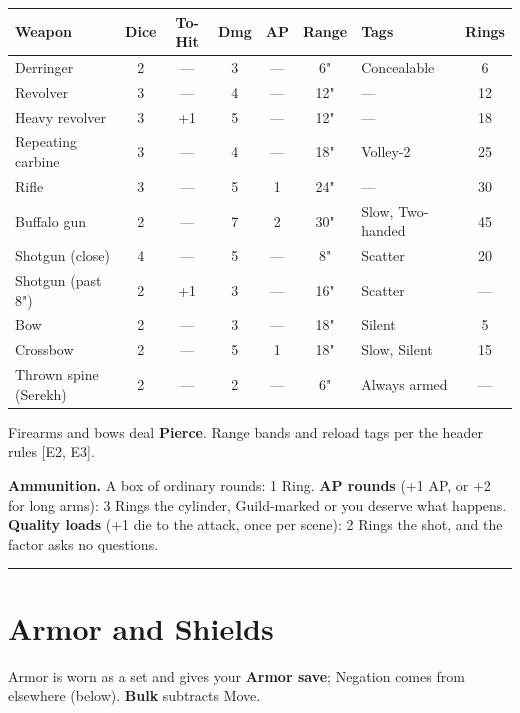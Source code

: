 \begin{center}
\small
\begin{tabular}{l|c|c|c|c|c|l|c}
\textbf{Weapon} & \textbf{Dice} & \textbf{To-Hit} & \textbf{Dmg} & \textbf{AP} & \textbf{Range} & \textbf{Tags} & \textbf{Rings} \\
\hline
Derringer & 2 & --- & 3 & --- & 6" & Concealable & 6 \\
Revolver & 3 & --- & 4 & --- & 12" & --- & 12 \\
Heavy revolver & 3 & +1 & 5 & --- & 12" & --- & 18 \\
Repeating carbine & 3 & --- & 4 & --- & 18" & Volley-2 & 25 \\
Rifle & 3 & --- & 5 & 1 & 24" & --- & 30 \\
Buffalo gun & 2 & --- & 7 & 2 & 30" & Slow, Two-handed & 45 \\
Shotgun (close) & 4 & --- & 5 & --- & 8" & Scatter & 20 \\
Shotgun (past 8") & 2 & +1 & 3 & --- & 16" & Scatter & --- \\
Bow & 2 & --- & 3 & --- & 18" & Silent & 5 \\
Crossbow & 2 & --- & 5 & 1 & 18" & Slow, Silent & 15 \\
Thrown spine (Serekh) & 2 & --- & 2 & --- & 6" & Always armed & --- \\
\end{tabular}
\end{center}

Firearms and bows deal \textbf{Pierce}. Range bands and reload tags per the header rules [E2, E3].

\textbf{Ammunition.} A box of ordinary rounds: 1 Ring. \textbf{AP rounds} (+1 AP, or +2 for long arms): 3 Rings the cylinder, Guild-marked or you deserve what happens. \textbf{Quality loads} (+1 die to the attack, once per scene): 2 Rings the shot, and the factor asks no questions.

\medskip\hrule\medskip

\section{Armor and Shields}

Armor is worn as a set and gives your \textbf{Armor save}; Negation comes from elsewhere (below). \textbf{Bulk} subtracts Move.

